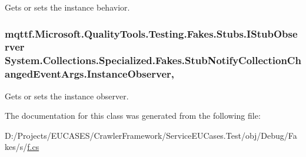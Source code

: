 Gets or sets the instance behavior.

\hypertarget{class_system_1_1_collections_1_1_specialized_1_1_fakes_1_1_stub_notify_collection_changed_event_args_afbff29243f41b09093d52eb78bab4cf0}{
\subsubsection[{Instance\-Observer}]{\setlength{\rightskip}{0pt plus 5cm}mqttf.\-Microsoft.\-Quality\-Tools.\-Testing.\-Fakes.\-Stubs.\-I\-Stub\-Observer System.\-Collections.\-Specialized.\-Fakes.\-Stub\-Notify\-Collection\-Changed\-Event\-Args.\-Instance\-Observer\hspace{0.3cm}{\ttfamily [get]}, {\ttfamily [set]}}}\label{class_system_1_1_collections_1_1_specialized_1_1_fakes_1_1_stub_notify_collection_changed_event_args_afbff29243f41b09093d52eb78bab4cf0}


Gets or sets the instance observer.



The documentation for this class was generated from the following file\-:\begin{DoxyCompactItemize}
\item 
D\-:/\-Projects/\-E\-U\-C\-A\-S\-E\-S/\-Crawler\-Framework/\-Service\-E\-U\-Cases.\-Test/obj/\-Debug/\-Fakes/s/\hyperlink{s_2f_8cs}{f.\-cs}\end{DoxyCompactItemize}
